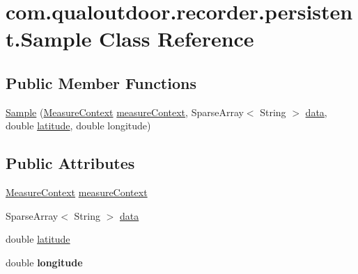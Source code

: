 \hypertarget{classcom_1_1qualoutdoor_1_1recorder_1_1persistent_1_1Sample}{\section{com.\-qualoutdoor.\-recorder.\-persistent.\-Sample Class Reference}
\label{classcom_1_1qualoutdoor_1_1recorder_1_1persistent_1_1Sample}
}
\subsection*{Public Member Functions}
\begin{DoxyCompactItemize}
\item 
\hyperlink{classcom_1_1qualoutdoor_1_1recorder_1_1persistent_1_1Sample_ab6e3377acb6df03cf431064e5c2ed4a2}{Sample} (\hyperlink{classcom_1_1qualoutdoor_1_1recorder_1_1persistent_1_1MeasureContext}{Measure\-Context} \hyperlink{classcom_1_1qualoutdoor_1_1recorder_1_1persistent_1_1Sample_a52c7340819515588f1e6d95ede6e2c4a}{measure\-Context}, Sparse\-Array$<$ String $>$ \hyperlink{classcom_1_1qualoutdoor_1_1recorder_1_1persistent_1_1Sample_aa1aae6bf605a0fa9a350dace8a59e4fd}{data}, double \hyperlink{classcom_1_1qualoutdoor_1_1recorder_1_1persistent_1_1Sample_a546a9b2be598d117d65a4f716318e882}{latitude}, double longitude)
\end{DoxyCompactItemize}
\subsection*{Public Attributes}
\begin{DoxyCompactItemize}
\item 
\hyperlink{classcom_1_1qualoutdoor_1_1recorder_1_1persistent_1_1MeasureContext}{Measure\-Context} \hyperlink{classcom_1_1qualoutdoor_1_1recorder_1_1persistent_1_1Sample_a52c7340819515588f1e6d95ede6e2c4a}{measure\-Context}
\item 
Sparse\-Array$<$ String $>$ \hyperlink{classcom_1_1qualoutdoor_1_1recorder_1_1persistent_1_1Sample_aa1aae6bf605a0fa9a350dace8a59e4fd}{data}
\item 
double \hyperlink{classcom_1_1qualoutdoor_1_1recorder_1_1persistent_1_1Sample_a546a9b2be598d117d65a4f716318e882}{latitude}
\item 
\hypertarget{classcom_1_1qualoutdoor_1_1recorder_1_1persistent_1_1Sample_a369c29b8f15082eec8ffda8c6048e429}{double {\bfseries longitude}}\label{classcom_1_1qualoutdoor_1_1recorder_1_1persistent_1_1Sample_a369c29b8f15082eec8ffda8c6048e429}

\end{DoxyCompactItemize}


